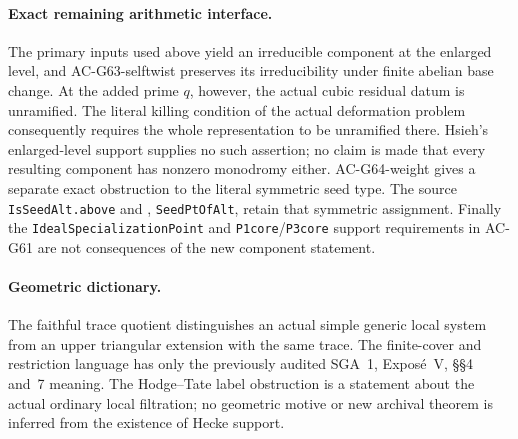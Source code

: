\paragraph{Exact remaining arithmetic interface.}
The primary inputs used above yield an irreducible component
at the enlarged level, and AC-G63-selftwist preserves its
irreducibility under finite abelian base change.  At the added
prime $q$, however, the actual cubic residual datum is
unramified.  The literal killing condition of the actual
deformation problem consequently requires the whole
representation to be unramified there.  Hsieh's enlarged-level
support supplies no such assertion; no claim is made that
every resulting component has nonzero monodromy either.
AC-G64-weight gives a separate exact obstruction to the
literal symmetric seed type.
The source \texttt{IsSeedAlt.above} and
,
\texttt{SeedPtOfAlt}, retain that symmetric assignment.
Finally the \texttt{IdealSpecializationPoint} and
\texttt{P1core}/\texttt{P3core} support requirements in
AC-G61 are not consequences of the new component statement.

\paragraph{Geometric dictionary.}
The faithful trace quotient distinguishes an actual simple
generic local system from an upper triangular extension with
the same trace.  The finite-cover and restriction language
has only the previously audited SGA~1, Expos\'e~V,
\S\S4 and~7 meaning.  The Hodge--Tate label obstruction is
a statement about the actual ordinary local filtration;
no geometric motive or new archival theorem is inferred
from the existence of Hecke support.
